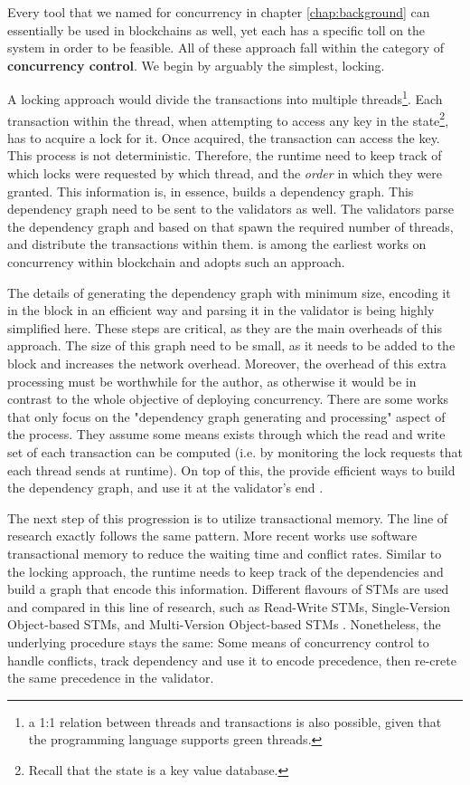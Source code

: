 Every tool that we named for concurrency in chapter \ref{chap:background} can essentially be used in
blockchains as well, yet each has a specific toll on the system in order to be feasible. All
of these approach fall within the category of \textbf{concurrency control}. We begin by
arguably the simplest, locking.

A locking approach would divide the transactions into multiple threads\footnote{a 1:1 relation
between threads and transactions is also possible, given that the programming language supports
green threads.}. Each transaction within the thread, when attempting to access any key in the
state\footnote{Recall that the state is a key value database.}, has to acquire a lock for it. Once
acquired, the transaction can access the key. This process is not deterministic.
Therefore, the runtime need to keep track of which locks were requested by which thread, and the
\textit{order} in which they were granted. This information is, in essence, builds a dependency
graph. This dependency graph need to be sent to the validators as well. The validators parse the
dependency graph and based on that spawn the required number of threads, and distribute the
transactions within them. \cite{dickersonSmartLocksAddingConcurrency2017} is among the earliest
works on concurrency within blockchain and adopts such an approach.

The details of generating the dependency graph with minimum size, encoding it in the block in an
efficient way and parsing it in the validator is being highly simplified here. These steps are
critical, as they are the main overheads of this approach. The size of this graph need to be small,
as it needs to be added to the block and increases the network overhead. Moreover, the overhead of
this extra processing must be worthwhile for the author, as otherwise it would be in contrast to the
whole objective of deploying concurrency. There are some works that only focus on the "dependency
graph generating and processing" aspect of the process. They assume some means exists through which
the read and write set of each transaction can be computed (i.e. by monitoring the lock requests
that each thread sends at runtime). On top of this, the provide efficient ways to build the
dependency graph, and use it at the validator's end \cite{EnablingConcurrencySmart2018}.

The next step of this progression is to utilize transactional memory. The line of research exactly
follows the same pattern. More recent works use software transactional memory to reduce the waiting
time and conflict rates. Similar to the locking approach, the runtime needs to keep track of the
dependencies and build a graph that encode this information. Different flavours of STMs are used and
compared in this line of research, such as Read-Write STMs, Single-Version Object-based STMs, and
Multi-Version Object-based STMs
\cite{anjanaSTMEfficientConcurrent2019,anjanaSTMEfficientFramework2019}. Nonetheless, the underlying
procedure stays the same: Some means of concurrency control to handle conflicts, track dependency
and use it to encode precedence, then re-crete the same precedence in the validator.

